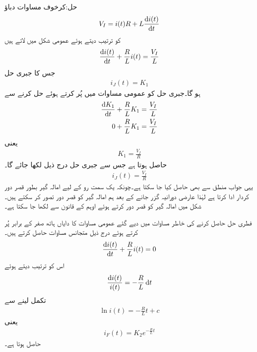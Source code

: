 حل:کرخوف مساوات دباؤ
\begin{align*}
V_I=i(t)R+L\frac{\dif i(t)}{\dif t}
\end{align*}
کو ترتیب دیتے ہوئے عمومی شکل میں لاتے ہیں
\begin{align}\label{مساوات_عارضی_امالہ_گیر_عمومی_الف}
\frac{\dif i(t)}{\dif t}+\frac{R}{L} i(t)=\frac{V_I}{L}
\end{align}
جس کا جبری حل
\begin{align*}
i_J(t)=K_1
\end{align*}
ہو گا۔جبری حل کو عمومی مساوات میں پُر کرتے ہوئے حل کرنے سے
\begin{align*}
\frac{\dif K_1}{\dif t}+\frac{R}{L} K_1&=\frac{V_I}{L}\\
0+\frac{R}{L} K_1&=\frac{V_I}{L}
\end{align*}
یعنی
\begin{align*}
K_1=\frac{V_I}{R}
\end{align*}
حاصل ہوتا ہے جس سے جبری حل درج ذیل لکھا جائے گا۔
\begin{align*}
i_J(t)=\frac{V_I}{R}
\end{align*}
یہی جواب منطق سے بھی حاصل کیا جا سکتا ہے۔چونکہ  یک سمت رو کے لیے امالہ گیر بطور قصر دور کردار ادا کرتا ہے لہٰذا عارضی دورانیہ گزر جانے کے بعد ہم امالہ گیر کو قصر دور تصور کر سکتے ہیں۔شکل  میں امالہ گیر کو قصر دور کرتے ہوئے اوہم کے قانون سے  لکھا جا سکتا ہے۔

فطری حل حاصل کرنے کی خاطر مساوات  میں دیے گئے عمومی مساوات کا دایاں ہاتھ صفر کے برابر پُر کرتے ہوئے درج ذیل متجانس مساوات حاصل کرتے ہیں۔
\begin{align*}
\frac{\dif i(t)}{\dif t}+\frac{R}{L} i(t)=0
\end{align*}
اس کو ترتیب دیتے ہوئے
\begin{align*}
\frac{\dif i(t)}{i(t)}=-\frac{R}{L} \dif t
\end{align*}
تکمل لینے سے
\begin{align*}
\ln i(t)=-\frac{R}{L}t +c
\end{align*}
یعنی
\begin{align*}
i_F(t)=K_2e^{-\frac{R}{L}t}
\end{align*}
حاصل ہوتا ہے۔

